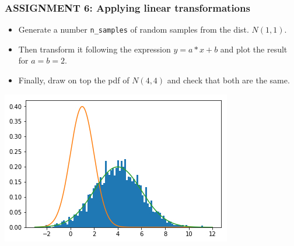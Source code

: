 \documentclass[11pt]{article}
\providecommand{\tightlist}{%
      \setlength{\itemsep}{0pt}\setlength{\parskip}{0pt}}
\begin{document}
    \hypertarget{assignment-6-applying-linear-transformations}{%
\subsubsection{\texorpdfstring{\textbf{{ASSIGNMENT 6: Applying linear
transformations}}}{ASSIGNMENT 6: Applying linear transformations}}\label{assignment-6-applying-linear-transformations}}

\begin{itemize}
\tightlist
\item
  Generate a number \texttt{n\_samples} of random samples from the dist.
  \(N(1,1)\).
\item
  Then transform it following the expression \(y = a*x + b\) and plot
  the result for \(a=b=2\).
\item
  Finally, draw on top the pdf of \(N(4,4)\) and check that both are the
  same.
\end{itemize}

\includegraphics{images/fig2-2-4.png}
\end{document}
